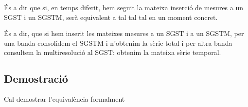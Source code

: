 







És a dir que  si, en temps diferit, hem seguit la mateixa inserció de mesures a un \gls{SGST} i un \gls{SGSTM}, 
serà equivalent a tal tal tal en un moment concret.

És a dir, que si hem inserit les mateixes mesures a un \gls{SGST} i a
un \gls{SGSTM}, per una banda consolidem el \gls{SGSTM} i n'obtenim la
sèrie total i per altra banda consultem la multiresolució al
\gls{SGST}: obtenim la mateixa sèrie temporal.


\subsection{Demostració}

Cal demostrar l'equivalència formalment\todo{}










